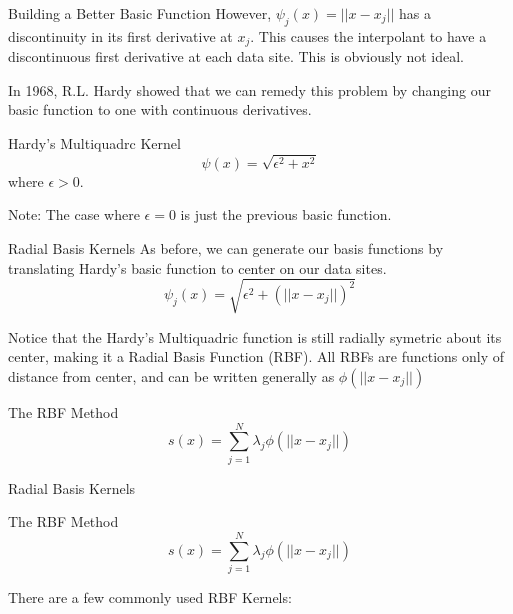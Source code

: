 \documentclass[12pt,t]{beamer}
\newcommand{\subt}[1]{{\footnotesize \color{subtitle} {#1}}}
\begin{document}
\begin{frame}{Building a Better Basic Function}
However, $\psi_j(x)=||x-x_j||$ has a discontinuity in its first derivative at $x_j$. This causes the interpolant to have a discontinuous first derivative at each data site. This is obviously not ideal.
\bigskip

In 1968, R.L. Hardy showed that we can remedy this problem by changing our basic function to one with continuous derivatives.

\subt{Hardy's Multiquadrc Kernel}
\begin{equation*}
\psi(x)=\sqrt{\epsilon^2 + x^2}
\end{equation*}
where $\epsilon > 0$.

\subt{Note:} The case where $\epsilon=0$ is just the previous basic function.

\note{}
\end{frame}

\begin{frame}{Radial Basis Kernels}
As before, we can generate our basis functions by translating Hardy's basic function to center on our data sites.
\begin{equation*}
\psi_j(x)=\sqrt{\epsilon^2 + (||x-x_j||)^2}
\end{equation*}

Notice that the Hardy's Multiquadric function is still radially symetric about its center, making it a Radial Basis Function (RBF). 
All RBFs are functions only of distance from center, and can be written generally as $\phi(||x-x_j||)$

\subt{The RBF Method}
\begin{equation*}
s(x)=\sum_{j=1}^N \lambda_j \phi(||x-x_j||)
\end{equation*}

\note{}
\end{frame}

\begin{frame}{Radial Basis Kernels}

\subt{The RBF Method}
\begin{equation*}
s(x)=\sum_{j=1}^N \lambda_j \phi(||x-x_j||)
\end{equation*}

There are a few commonly used RBF Kernels:


\end{frame}
\end{document}
